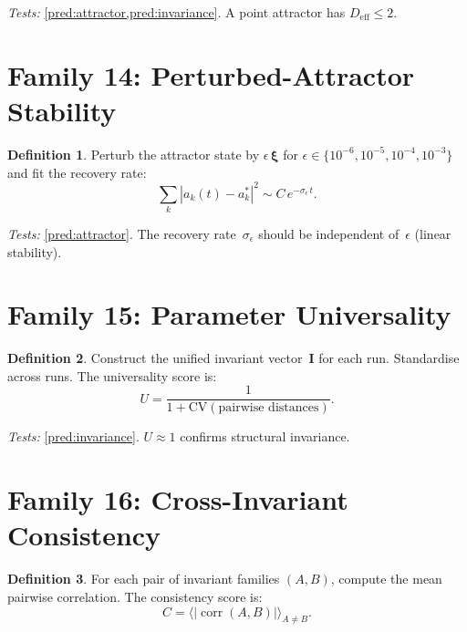 \documentclass[11pt,twoside,openright]{book}
\theoremstyle{definition}
\newtheorem{definition}{Definition}[chapter]
\theoremstyle{plain}
\theoremstyle{definition}
\theoremstyle{remark}
\newcommand{\CV}{\mathrm{CV}}
\DeclareMathOperator{\corr}{corr}
\begin{document}
\noindent\emph{Tests:} \cref{pred:attractor,pred:invariance}. A point attractor has \(D_{\mathrm{eff}} \leq 2\).

\section{Family 14: Perturbed-Attractor Stability}\label{sec:fam-perturbed}

\begin{definition}\label{def:perturbed}
Perturb the attractor state by \(\epsilon\,\boldsymbol{\xi}\) for \(\epsilon \in \{10^{-6}, 10^{-5}, 10^{-4}, 10^{-3}\}\) and fit the recovery rate:
\begin{equation}\label{eq:recovery}
\sum_k |a_k(t) - a_k^*|^2 \sim C\,e^{-\sigma_\epsilon\,t}.
\end{equation}
\end{definition}

\noindent\emph{Tests:} \cref{pred:attractor}. The recovery rate~\(\sigma_\epsilon\) should be independent of~\(\epsilon\) (linear stability).

\section{Family 15: Parameter Universality}\label{sec:fam-universality}

\begin{definition}\label{def:universality}
Construct the unified invariant vector~\(\mathbf{I}\) for each run. Standardise across runs. The universality score is:
\begin{equation}\label{eq:U-score}
U = \frac{1}{1 + \CV(\text{pairwise distances})}.
\end{equation}
\end{definition}

\noindent\emph{Tests:} \cref{pred:invariance}. \(U \approx 1\) confirms structural invariance.

\section{Family 16: Cross-Invariant Consistency}\label{sec:fam-consistency}

\begin{definition}\label{def:consistency}
For each pair of invariant families \((A, B)\), compute the mean pairwise correlation. The consistency score is:
\begin{equation}\label{eq:C-score}
C = \bigl\langle |\corr(A, B)| \bigr\rangle_{A \neq B}.
\end{equation}
\end{definition}
\end{document}
